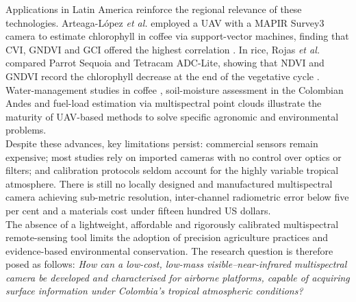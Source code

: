 \noindent Applications in Latin America reinforce the regional relevance of
these technologies.  Arteaga-López \emph{et al.} employed a UAV with a
MAPIR Survey3 camera to estimate chlorophyll in coffee via support-vector
machines, finding that CVI, GNDVI and GCI offered the highest
correlation \cite{Arteaga2022}.  In rice, Rojas \emph{et al.} compared
Parrot Sequoia and Tetracam ADC-Lite, showing that NDVI and GNDVI record
the chlorophyll decrease at the end of the vegetative cycle
\cite{Rojas2018Drones}.  Water-management studies in coffee
\cite{Orlando2023POTENTIALIRRIGATION}, soil-moisture assessment in the
Colombian Andes \cite{Casamitjana2020SoilMoisture} and fuel-load
estimation via multispectral point clouds
\cite{Villacres2022ConstructionAreas} illustrate the maturity of
UAV-based methods to solve specific agronomic and environmental
problems.\\

\noindent Despite these advances, key limitations persist: commercial
sensors remain expensive; most studies rely on imported cameras with no
control over optics or filters; and calibration protocols seldom account
for the highly variable tropical atmosphere.  There is still no locally
designed and manufactured multispectral camera achieving sub-metric
resolution, inter-channel radiometric error below five per cent and a
materials cost under fifteen hundred US dollars.\\

\noindent The absence of a lightweight, affordable and rigorously calibrated
multispectral remote-sensing tool limits the adoption of precision
agriculture practices and evidence-based environmental conservation.
The research question is therefore posed as follows: \emph{How can a
low-cost, low-mass visible–near-infrared multispectral camera be
developed and characterised for airborne platforms, capable of acquiring
surface information under Colombia’s tropical atmospheric
conditions?}\\


